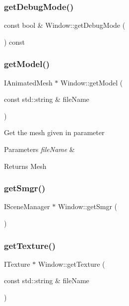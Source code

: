 \subsubsection{\texorpdfstring{getDebugMode()}{getDebugMode()}}
{\footnotesize\ttfamily const bool \& Window\+::get\+Debug\+Mode (\begin{DoxyParamCaption}{ }\end{DoxyParamCaption}) const}

\mbox{\label{class_window_a484652aab3089f622a25592a0a8879f4}} 
\subsubsection{\texorpdfstring{getModel()}{getModel()}}
{\footnotesize\ttfamily I\+Animated\+Mesh $\ast$ Window\+::get\+Model (\begin{DoxyParamCaption}\item[{const std\+::string \&}]{file\+Name }\end{DoxyParamCaption})}

Get the mesh given in parameter 
\begin{DoxyParams}{Parameters}
{\em file\+Name} & \\
\hline
\end{DoxyParams}
\begin{DoxyReturn}{Returns}
Mesh 
\end{DoxyReturn}
\mbox{\label{class_window_a27869844ea5a217d2900240dccfd060e}} 
\subsubsection{\texorpdfstring{getSmgr()}{getSmgr()}}
{\footnotesize\ttfamily I\+Scene\+Manager $\ast$ Window\+::get\+Smgr (\begin{DoxyParamCaption}{ }\end{DoxyParamCaption})}

\mbox{\label{class_window_a87adb3354813045de3d5743ef66643d3}} 
\subsubsection{\texorpdfstring{getTexture()}{getTexture()}}
{\footnotesize\ttfamily I\+Texture $\ast$ Window\+::get\+Texture (\begin{DoxyParamCaption}\item[{const std\+::string \&}]{file\+Name }\end{DoxyParamCaption})}

